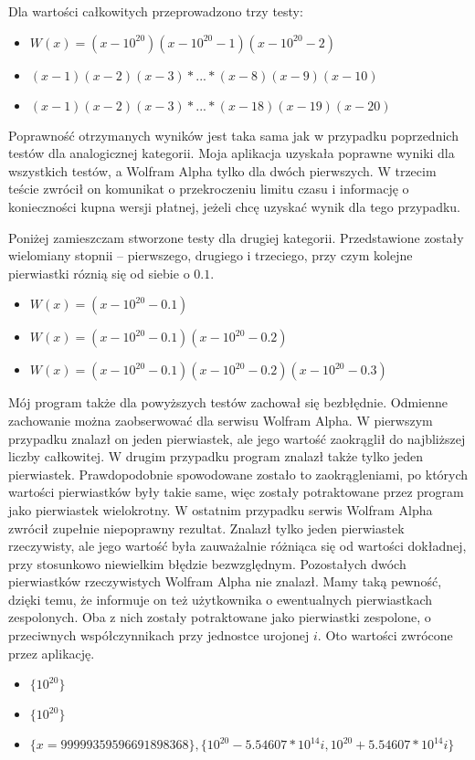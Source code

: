 \documentclass[oneside,a4paper]{book}
\begin{document}
	Dla wartości całkowitych przeprowadzono trzy testy:
	\begin{itemize}
		\item $W(x)=(x-10^{20})(x-10^{20}-1)(x-10^{20}-2)$
		\item $(x-1)(x-2)(x-3)*...*(x-8)(x-9)(x-10)$
		\item $(x-1)(x-2)(x-3)*...*(x-18)(x-19)(x-20)$
	\end{itemize}
	
	Poprawność otrzymanych wyników jest taka sama jak w przypadku poprzednich testów dla analogicznej kategorii. Moja aplikacja uzyskała poprawne wyniki dla wszystkich testów, a Wolfram Alpha tylko dla dwóch pierwszych. W trzecim teście zwrócił on komunikat o przekroczeniu limitu czasu i informację o konieczności kupna wersji płatnej, jeżeli chcę uzyskać wynik dla tego przypadku.
	
	Poniżej zamieszczam stworzone testy dla drugiej kategorii. Przedstawione zostały wielomiany stopnii -- pierwszego, drugiego i trzeciego, przy czym kolejne pierwiastki róznią się od siebie o $0.1$.
	\begin{itemize}
		\item $W(x)=(x-10^{20}-0.1)$
		\item $W(x)=(x-10^{20}-0.1)(x-10^{20}-0.2)$
		\item $W(x)=(x-10^{20}-0.1)(x-10^{20}-0.2)(x-10^{20}-0.3)$
	\end{itemize}
	
	Mój program także dla powyższych testów zachował się bezbłędnie. Odmienne zachowanie można zaobserwować dla serwisu Wolfram Alpha. W pierwszym przypadku znalazł on jeden pierwiastek, ale jego wartość zaokrąglił do najbliższej liczby całkowitej. W drugim przypadku program znalazł także tylko jeden pierwiastek. Prawdopodobnie spowodowane zostało to zaokrągleniami, po których wartości pierwiastków były takie same, więc zostały potraktowane przez program jako pierwiastek wielokrotny. W ostatnim przypadku serwis Wolfram Alpha zwrócił zupełnie niepoprawny rezultat. Znalazł tylko jeden pierwiastek rzeczywisty, ale jego wartość była zauważalnie różniąca się od wartości dokładnej, przy stosunkowo niewielkim błędzie bezwzględnym. Pozostałych dwóch pierwiastków rzeczywistych Wolfram Alpha nie znalazł. Mamy taką pewność, dzięki temu, że informuje on też użytkownika o ewentualnych pierwiastkach zespolonych. Oba z nich zostały potraktowane jako pierwiastki zespolone, o przeciwnych współczynnikach przy jednostce urojonej $i$. Oto wartości zwrócone przez aplikację.
	\begin{itemize}
		\item $\{10^{20}\}$
		\item $\{10^{20}\}$
		\item $\{x = 99999359596691898368\}, \{10^{20}-5.54607*10^{14}i, 10^{20}+5.54607*10^{14}i\}$
	\end{itemize}
	
\end{document}
